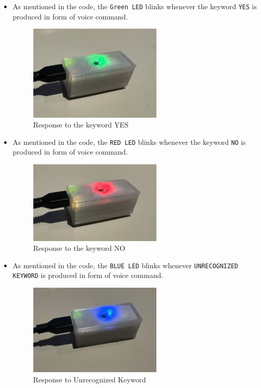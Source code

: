 \begin{itemize}
	\item As mentioned in the code, the \texttt{Green LED} blinks whenever the keyword \texttt{YES} is produced in form of voice command.

\begin{figure}[h!]
	\centering
	\includegraphics[width=0.6\textwidth]{Images/testhardware/ArduinoGreen}
	\caption{ Response to the
		keyword YES} \label{fig:ArduinoGreen}
\end{figure}

	\item  As mentioned in the code, the \texttt{RED LED} blinks whenever the keyword \texttt{NO} is produced in form of voice command.
	
	\begin{figure}[h!]
		\centering
		\includegraphics[width=0.6\textwidth]{Images/testhardware/ArduinoRed}
		\caption{ Response to the
			keyword NO} \label{fig:ArduinoRed}
	\end{figure}
	
		\item  As mentioned in the code, the \texttt{BLUE LED} blinks whenever \texttt{UNRECOGNIZED KEYWORD} is produced in form of voice command.
		
		\begin{figure}[h!]
			\centering
			\includegraphics[width=0.6\textwidth]{Images/testhardware/ArduinoBlue}
			\caption{ Response to Unrecognized Keyword} \label{fig:ArduinoBlue}
		\end{figure}
\end{itemize}

